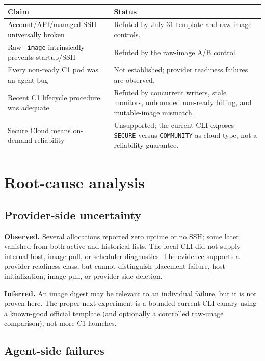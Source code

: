 \documentclass[10pt]{article}
\newcommand{\obs}{\textbf{Observed.} }
\newcommand{\inferr}{\textbf{Inferred.} }
\begin{document}
\begin{center}
\begin{tabular}{p{}p{}}
\toprule
Claim & Status \\
\midrule
Account/API/managed SSH universally broken & Refuted by July 31 template and raw-image controls. \\
Raw \texttt{--image} intrinsically prevents startup/SSH & Refuted by the raw-image A/B control. \\
Every non-ready C1 pod was an agent bug & Not established; provider readiness failures are observed. \\
Recent C1 lifecycle procedure was adequate & Refuted by concurrent writers, stale monitors, unbounded non-ready billing, and mutable-image mismatch. \\
Secure Cloud means on-demand reliability & Unsupported; the current CLI exposes \texttt{SECURE} versus \texttt{COMMUNITY} as cloud type, not a reliability guarantee. \\
\bottomrule
\end{tabular}
\end{center}

\section*{Root-cause analysis}

\subsection*{Provider-side uncertainty}

\obs Several allocations reported zero uptime or no SSH; some later vanished
from both active and historical lists.  The local CLI did not supply internal
host, image-pull, or scheduler diagnostics.  The evidence supports a
provider-readiness class, but cannot distinguish placement failure, host
initialization, image pull, or provider-side deletion.

\inferr An image digest may be relevant to an individual failure, but it is
not proven here.  The proper next experiment is a bounded current-CLI canary
using a known-good official template (and optionally a controlled raw-image
comparison), not more C1 launches.

\subsection*{Agent-side failures}
\end{document}
